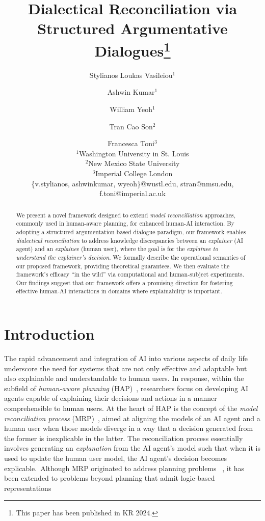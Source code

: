 \documentclass{article}
\title{Dialectical Reconciliation via Structured Argumentative Dialogues\footnote{This paper has been published in KR 2024.}}
\author{Stylianos Loukas Vasileiou$^1$\and
Ashwin Kumar$^1$\and
William Yeoh$^1$\and
Tran Cao Son$^2$\and
Francesca Toni$^3$ \\
\affiliations
$^1$Washington University in St. Louis\\
$^2$New Mexico State University\\
$^3$Imperial College London\\
\emails
\{v.stylianos, ashwinkumar, wyeoh\}@wustl.edu,
stran@nmsu.edu,
f.toni@imperial.ac.uk}
\begin{document}
\maketitle

\begin{abstract}

We present a novel framework designed to extend \textit{model reconciliation} approaches, commonly used in human-aware planning, for enhanced human-AI interaction. By adopting a structured argumentation-based dialogue paradigm, our framework enables \textit{dialectical reconciliation} to address knowledge discrepancies between an \textit{explainer} (AI agent) and an \textit{explainee} (human user), where the goal is for the \textit{explainee to understand the explainer's decision}. We formally describe the operational semantics of our proposed framework, providing theoretical guarantees. We then evaluate the framework's efficacy ``in the wild'' via computational and human-subject experiments. Our findings suggest that our framework offers a promising direction for fostering effective human-AI interactions in domains where explainability is important. 

\end{abstract}

\section{Introduction}

The rapid advancement and integration of AI %
into various aspects of daily life underscore the need for systems that are not only effective and adaptable but also explainable and understandable to human users. In response, within the subfield of \textit{human-aware planning} (HAP)~\citep{kambhampati2019synthesizing}, researchers focus on developing AI agents capable of explaining their decisions and actions in a manner comprehensible to human users. At the heart of HAP is the concept of the \textit{model reconciliation process} (MRP)~\citep{chakraborti2017plan}, 
aimed at aligning the models of an AI agent and a human user when those models
diverge in a way that a decision generated from 
the former is inexplicable in the 
latter. The reconciliation process essentially involves generating an \textit{explanation} from the AI agent's model such that when it is used to update the human user model, the AI agent's decision becomes explicable.~Although MRP originated to address planning problems ~\cite{sreedharan2021foundations}, it has been extended to problems beyond planning that admit %
logic-based representations ~\cite{son2021model,vasileioulogic}
\end{document}
